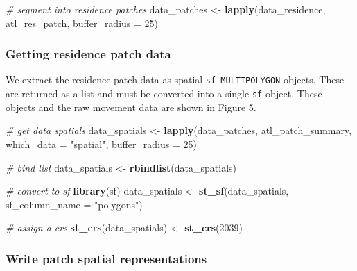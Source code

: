 \documentclass[
]{scrartcl}
\newenvironment{Shaded}{}{}
\newcommand{\CommentTok}[1]{\textcolor[rgb]{0.38,0.63,0.69}{\textit{#1}}}
\newcommand{\DataTypeTok}[1]{\textcolor[rgb]{0.56,0.13,0.00}{#1}}
\newcommand{\DecValTok}[1]{\textcolor[rgb]{0.25,0.63,0.44}{#1}}
\newcommand{\KeywordTok}[1]{\textcolor[rgb]{0.00,0.44,0.13}{\textbf{#1}}}
\newcommand{\NormalTok}[1]{#1}
\newcommand{\StringTok}[1]{\textcolor[rgb]{0.25,0.44,0.63}{#1}}
\begin{document}
\begin{Shaded}
\begin{Highlighting}[]
\CommentTok{\# segment into residence patches}
\NormalTok{data\_patches <{-}}\StringTok{ }\KeywordTok{lapply}\NormalTok{(data\_residence, atl\_res\_patch,}
                       \DataTypeTok{buffer\_radius =} \DecValTok{25}\NormalTok{)}
\end{Highlighting}
\end{Shaded}

\hypertarget{getting-residence-patch-data}{%
\subsubsection{Getting residence patch data}\label{getting-residence-patch-data}}

We extract the residence patch data as spatial \texttt{sf-MULTIPOLYGON} objects.
These are returned as a list and must be converted into a single \texttt{sf} object.
These objects and the raw movement data are shown in Figure 5.

\begin{Shaded}
\begin{Highlighting}[]
\CommentTok{\# get data spatials}
\NormalTok{data\_spatials <{-}}\StringTok{ }\KeywordTok{lapply}\NormalTok{(data\_patches, atl\_patch\_summary,}
                        \DataTypeTok{which\_data =} \StringTok{"spatial"}\NormalTok{,}
                        \DataTypeTok{buffer\_radius =} \DecValTok{25}\NormalTok{)}

\CommentTok{\# bind list}
\NormalTok{data\_spatials <{-}}\StringTok{ }\KeywordTok{rbindlist}\NormalTok{(data\_spatials)}

\CommentTok{\# convert to sf}
\KeywordTok{library}\NormalTok{(sf)}
\NormalTok{data\_spatials <{-}}\StringTok{ }\KeywordTok{st\_sf}\NormalTok{(data\_spatials, }\DataTypeTok{sf\_column\_name =} \StringTok{"polygons"}\NormalTok{)}

\CommentTok{\# assign a crs}
\KeywordTok{st\_crs}\NormalTok{(data\_spatials) <{-}}\StringTok{ }\KeywordTok{st\_crs}\NormalTok{(}\DecValTok{2039}\NormalTok{)}
\end{Highlighting}
\end{Shaded}

\hypertarget{write-patch-spatial-representations}{%
\subsubsection{Write patch spatial representations}\label{write-patch-spatial-representations}}
\end{document}

